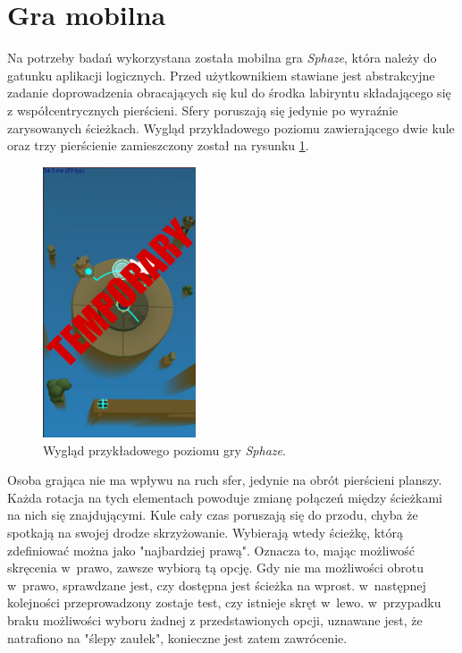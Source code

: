 \documentclass[a4paper,12pt,numbers=noenddot]{report}
\begin{document}
\section{Gra mobilna}
Na potrzeby badań wykorzystana została mobilna gra \textit{Sphaze}, która należy do gatunku aplikacji logicznych. Przed użytkownikiem stawiane jest abstrakcyjne zadanie doprowadzenia obracających się kul do środka labiryntu składającego się z współcentrycznych pierścieni. Sfery poruszają się jedynie po wyraźnie zarysowanych ścieżkach. Wygląd przykładowego poziomu zawierającego dwie kule oraz trzy pierścienie zamieszczony został na rysunku \ref{fig:sphaze_1}.

\begin{figure}[h!]
	\centering
  	\includegraphics[height=8cm]{fig/tmp.jpg}
	\caption{Wygląd przykładowego poziomu gry \textit{Sphaze}.}
	\label{fig:sphaze_1}
\end{figure}

Osoba grająca nie ma wpływu na ruch sfer, jedynie na obrót pierścieni planszy. Każda rotacja na tych elementach powoduje zmianę połączeń między ścieżkami na nich się znajdującymi. Kule cały czas poruszają się do przodu, chyba że spotkają na swojej drodze skrzyżowanie. Wybierają wtedy ścieżkę, którą zdefiniować można jako "najbardziej prawą". Oznacza to, mając możliwość skręcenia w~prawo, zawsze wybiorą tą opcję. Gdy nie ma możliwości obrotu w~prawo, sprawdzane jest, czy dostępna jest ścieżka na wprost. w~następnej kolejności przeprowadzony zostaje test, czy istnieje skręt w~lewo. w~przypadku braku możliwości wyboru żadnej z przedstawionych opcji, uznawane jest, że natrafiono na "ślepy zaułek", konieczne jest zatem zawrócenie.
\end{document}
